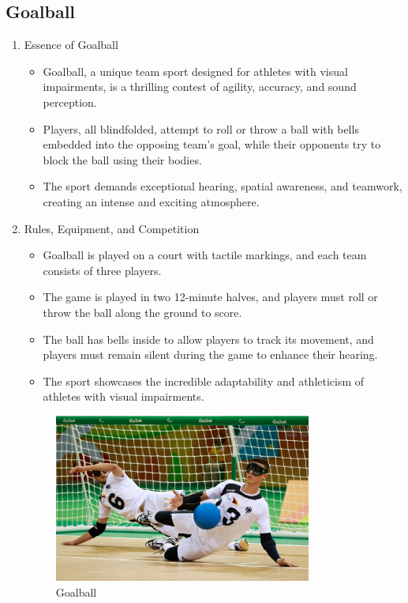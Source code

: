 \subsection{Goalball}

\begin{enumerate}

\item Essence of Goalball
    \begin{itemize}
    \item Goalball, a unique team sport designed for athletes with visual impairments, is a thrilling contest of agility, accuracy, and sound perception. 
    \item Players, all blindfolded, attempt to roll or throw a ball with bells embedded into the opposing team's goal, while their opponents try to block the ball using their bodies. 
    \item The sport demands exceptional hearing, spatial awareness, and teamwork, creating an intense and exciting atmosphere.
    \end{itemize}

\item Rules, Equipment, and Competition
    \begin{itemize}
    \item Goalball is played on a court with tactile markings, and each team consists of three players. 
    \item The game is played in two 12-minute halves, and players must roll or throw the ball along the ground to score. 
    \item The ball has bells inside to allow players to track its movement, and players must remain silent during the game to enhance their hearing. 
    \item The sport showcases the incredible adaptability and athleticism of athletes with visual impairments.
    \end{itemize}

\begin{figure}[htbp] %
\centering
\includegraphics[width=0.8\textwidth]{Images/goalball.JPG}
\caption{Goalball}
\label{fig:my_image}
\end{figure}


\end{enumerate}
